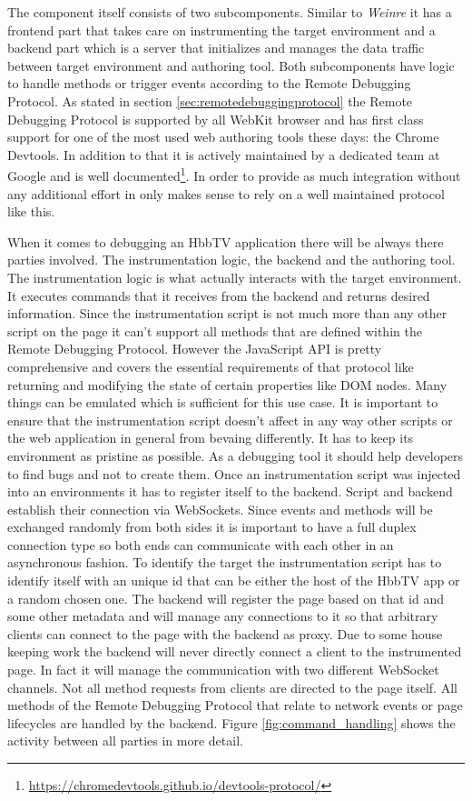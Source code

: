 The component itself consists of two subcomponents. Similar to \textit{Weinre} it has a frontend
part that takes care on instrumenting the target environment and a backend part which is a server
that initializes and manages the data traffic between target environment and authoring tool. Both
subcomponents have logic to handle methods or trigger events according to the Remote Debugging
Protocol. As stated in section \ref{sec:remotedebuggingprotocol} the Remote Debugging Protocol is
supported by all WebKit browser and has first class support for one of the most used web authoring
tools these days: the Chrome Devtools. In addition to that it is actively maintained by a dedicated
team at Google and is well documented\footnote{\url{https://chromedevtools.github.io/devtools-protocol/}}.
In order to provide as much integration without any additional effort in only makes sense to rely on
a well maintained protocol like this.

When it comes to debugging an HbbTV application there will be always there parties involved. The
instrumentation logic, the backend and the authoring tool. The instrumentation logic is what actually
interacts with the target environment. It executes commands that it receives from the backend and
returns desired information. Since the instrumentation script is not much more than any other script
on the page it can't support all methods that are defined within the Remote Debugging Protocol.
However the JavaScript API is pretty comprehensive and covers the essential requirements of that
protocol like returning and modifying the state of certain properties like DOM nodes. Many things can
be emulated which is sufficient for this use case. It is important to ensure that the instrumentation
script doesn't affect in any way other scripts or the web application in general from bevaing
differently. It has to keep its environment as pristine as possible. As a debugging tool it should
help developers to find bugs and not to create them. Once an instrumentation script was injected
into an environments it has to register itself to the backend. Script and backend establish their
connection via WebSockets. Since events and methods will be exchanged randomly from both sides
it is important to have a full duplex connection type so both ends can communicate with each other
in an asynchronous fashion. To identify the target the instrumentation script has to identify
itself with an unique id that can be either the host of the HbbTV app or a random chosen one. The
backend will register the page based on that id and some other metadata and will manage any
connections to it so that arbitrary clients can connect to the page with the backend as proxy. Due
to some house keeping work the backend will never directly connect a client to the instrumented
page. In fact it will manage the communication with two different WebSocket channels. Not all method
requests from clients are directed to the page itself. All methods of the Remote Debugging Protocol
that relate to network events or page lifecycles are handled by the backend. Figure \ref{fig:command_handling}
shows the activity between all parties in more detail.

